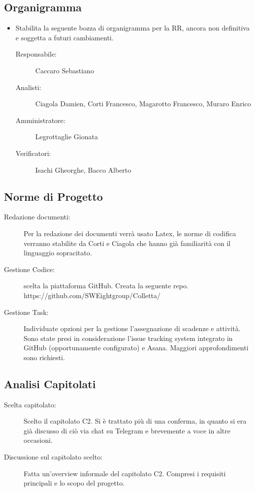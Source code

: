 \documentclass[a4paper, oneside, openany, dvipsnames, table]{article}
\begin{document}
\subsection{Organigramma}
\begin{itemize}
\item Stabilita la seguente bozza di organigramma per la RR, ancora non definitiva e soggetta a futuri cambiamenti.
	\begin{description}
	\item [Responsabile:] Caccaro Sebastiano
	\item [Analisti:] Ciagola Damien, Corti Francesco, Magarotto Francesco, Muraro Enrico
	\item [Amministratore:] Legrottaglie Gionata
	\item [Verificatori:] Isachi Gheorghe, Bacco Alberto
	\end{description}
\end{itemize}

\subsection{Norme di Progetto}
\begin{description}
\item [Redazione documenti:] Per la redazione dei documenti verrà usato Latex, le norme di codifica verranno stabilite da Corti e Ciagola che hanno già familiarità con il linguaggio sopracitato.
\item [Gestione Codice:] scelta la piattaforma GitHub. Creata la seguente repo. https://github.com/SWEightgroup/Colletta/
\item [Gestione Task:] Individuate opzioni per la gestione l'assegnazione di scadenze e attività. Sono state presi in considerazione l’issue tracking system integrato in GitHub (opportunamente configurato) e Asana. Maggiori approfondimenti sono richiesti.
\end{description}

\subsection{Analisi Capitolati}
\begin{description}
\item [Scelta capitolato:] Scelto il capitolato C2. Si è trattato più di una conferma, in quanto si era già discusso di ciò via chat su Telegram e brevemente a voce in altre occasioni.
\item [Discussione sul capitolato scelto:] Fatta un’overview informale del capitolato C2. Compresi i requisiti principali e lo scopo del progetto.
\end{description}
\end{document}

